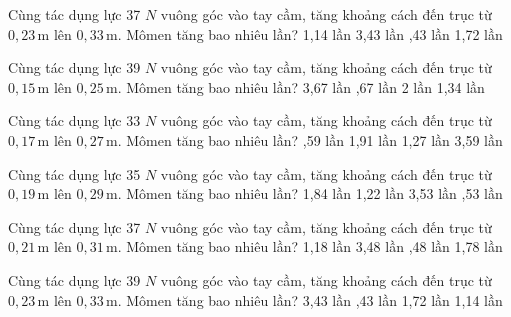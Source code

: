 \begin{ex}
Cùng tác dụng lực 37 $N$ vuông góc vào tay cầm, tăng khoảng cách đến trục từ $0,23\,\text{m}$ lên $0,33\,\text{m}$. Mômen tăng bao nhiêu lần?
\choice
{1,14 lần}
{3,43 lần}
{,43 lần}
{1,72 lần}
\end{ex}

\begin{ex}
Cùng tác dụng lực 39 $N$ vuông góc vào tay cầm, tăng khoảng cách đến trục từ $0,15\,\text{m}$ lên $0,25\,\text{m}$. Mômen tăng bao nhiêu lần?
\choice
{3,67 lần}
{,67 lần}
{2 lần}
{1,34 lần}
\end{ex}

\begin{ex}
Cùng tác dụng lực 33 $N$ vuông góc vào tay cầm, tăng khoảng cách đến trục từ $0,17\,\text{m}$ lên $0,27\,\text{m}$. Mômen tăng bao nhiêu lần?
\choice
{,59 lần}
{1,91 lần}
{1,27 lần}
{3,59 lần}
\end{ex}

\begin{ex}
Cùng tác dụng lực 35 $N$ vuông góc vào tay cầm, tăng khoảng cách đến trục từ $0,19\,\text{m}$ lên $0,29\,\text{m}$. Mômen tăng bao nhiêu lần?
\choice
{1,84 lần}
{1,22 lần}
{3,53 lần}
{,53 lần}
\end{ex}

\begin{ex}
Cùng tác dụng lực 37 $N$ vuông góc vào tay cầm, tăng khoảng cách đến trục từ $0,21\,\text{m}$ lên $0,31\,\text{m}$. Mômen tăng bao nhiêu lần?
\choice
{1,18 lần}
{3,48 lần}
{,48 lần}
{1,78 lần}
\end{ex}

\begin{ex}
Cùng tác dụng lực 39 $N$ vuông góc vào tay cầm, tăng khoảng cách đến trục từ $0,23\,\text{m}$ lên $0,33\,\text{m}$. Mômen tăng bao nhiêu lần?
\choice
{3,43 lần}
{,43 lần}
{1,72 lần}
{1,14 lần}
\end{ex}

